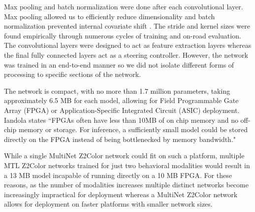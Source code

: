 Max pooling and batch normalization were done after each convolutional layer. Max pooling allowed us to efficiently reduce dimensionality and batch normalization prevented internal covariate shift \cite{ioffe2015batch}. The stride and kernel sizes were found empirically through numerous cycles of training and on-road evaluation.
The convolutional layers were designed to act as feature extraction layers whereas the final fully connected layers act as a steering controller. However, the network was trained in an end-to-end manner so we did not isolate different forms of processing to specific sections of the network.

The network is compact, with no more than 1.7 million parameters, taking approximately 6.5 MB for each model, allowing for Field Programmable Gate Array (FPGA) or Application-Specific Integrated Circuit (ASIC) deployment. Iandola states ``FPGAs often have less than 10MB of on chip memory and no off-chip memory or storage. For inference, a sufficiently small model could be stored directly on the FPGA instead of being bottlenecked by memory bandwidth." \cite{DBLP:journals/corr/IandolaMAHDK16}


While a single MultiNet Z2Color network could fit on such a platform, multiple MTL Z2Color networks trained for just two behavioral modalities would result in a 13 MB model incapable of running directly on a 10 MB FPGA. For these reasons, as the number of modalities increases multiple distinct networks become increasingly impractical for deployment whereas a MultiNet Z2Color network allows for deployment on faster platforms with smaller network sizes.


